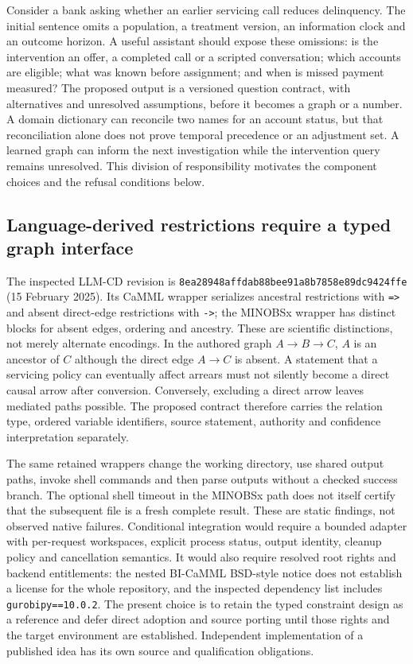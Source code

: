 Consider a bank asking whether an earlier servicing call reduces delinquency.
The initial sentence omits a population, a treatment version, an information
clock and an outcome horizon. A useful assistant should expose these omissions:
is the intervention an offer, a completed call or a scripted conversation;
which accounts are eligible; what was known before assignment; and when is
missed payment measured? The proposed output is a versioned question contract,
with alternatives and unresolved assumptions, before it becomes a graph or a
number. A domain dictionary can reconcile two names for an account status, but
that reconciliation alone does not prove temporal precedence or an adjustment
set. A learned graph can inform the next investigation while the intervention
query remains unresolved. This division of responsibility motivates the
component choices and the refusal conditions below.~\citep{exec25_agents_choice}

\subsection{Language-derived restrictions require a typed graph interface}
The inspected LLM-CD revision is
\texttt{8ea28948affdab88bee91}\allowbreak\texttt{a8b7858e89dc9424ffe}
(15 February 2025). Its CaMML wrapper serializes ancestral restrictions with
\texttt{=>} and absent direct-edge restrictions with \texttt{->}; the MINOBSx
wrapper has distinct blocks for absent edges, ordering and ancestry. These are
scientific distinctions, not merely alternate encodings. In the authored graph
$A\to B\to C$, $A$ is an ancestor of $C$ although the direct edge $A\to C$ is
absent. A statement that a servicing policy can eventually affect arrears must
not silently become a direct causal arrow after conversion. Conversely,
excluding a direct arrow leaves mediated paths possible. The proposed contract
therefore carries the relation type, ordered variable identifiers, source
statement, authority and confidence interpretation separately.~\citep{exec14_iid_cd,exec25_agents_choice}

The same retained wrappers change the working directory, use shared output
paths, invoke shell commands and then parse outputs without a checked success
branch. The optional shell timeout in the MINOBSx path does not itself certify
that the subsequent file is a fresh complete result. These are static findings,
not observed native failures. Conditional integration would require a bounded
adapter with per-request workspaces, explicit process status, output identity,
cleanup policy and cancellation semantics. It would also require resolved root
rights and backend entitlements: the nested BI-CaMML BSD-style notice does not
establish a license for the whole repository, and the inspected dependency list
includes \texttt{gurobipy==10.0.2}. The present choice is to retain the typed
constraint design as a reference and defer direct adoption and source porting
until those rights and the target environment are established. Independent
implementation of a published idea has its own source and qualification
obligations.~\citep{exec14_iid_cd,exec25_agents_choice}

